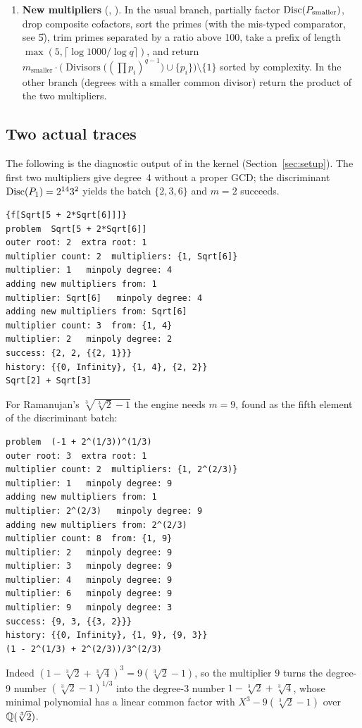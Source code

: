 \begin{enumerate}
      the new one immediately. A solution stops the search when it is the first
      finite-degree record or when the degree dropped by a factor $\ge q$;
      otherwise the search continues for ``additional denesting''. After the
      first pass, products of the promising initial multipliers are formed by
       and appended ().
\item \textbf{New multipliers} (, ). In the
      usual branch, partially factor $\operatorname{Disc}(P_{\text{smaller}})$, drop composite
      cofactors, sort the primes (with the mis-typed comparator, see \U{5}), trim
      primes separated by a ratio above 100, take a prefix of length
      $\max(5,\lceil\log1000/\log q\rceil)$, and return
      $m_{\text{smaller}}\cdot\big(\operatorname{Divisors}\big((\prod p_i)^{q-1}\big)\cup\{p_i\}\big)\setminus\{1\}$
      sorted by complexity. In the other branch (degrees with a smaller common
      divisor) return the product of the two multipliers.
\end{enumerate}

\subsection{Two actual traces}
The following is the diagnostic output of 
in the kernel (Section~\ref{sec:setup}). The first two multipliers give degree~4
without a proper GCD; the discriminant $\operatorname{Disc}(P_1)=2^{14}3^2$ yields the batch
$\{2,3,6\}$ and $m=2$ succeeds.
\begin{lstlisting}
{f[Sqrt[5 + 2*Sqrt[6]]]}
problem  Sqrt[5 + 2*Sqrt[6]]
outer root: 2  extra root: 1
multiplier count: 2  multipliers: {1, Sqrt[6]}
multiplier: 1   minpoly degree: 4
adding new multipliers from: 1
multiplier: Sqrt[6]   minpoly degree: 4
adding new multipliers from: Sqrt[6]
multiplier count: 3  from: {1, 4}
multiplier: 2   minpoly degree: 2
success: {2, 2, {{2, 1}}}
history: {{0, Infinity}, {1, 4}, {2, 2}}
Sqrt[2] + Sqrt[3]
\end{lstlisting}
For Ramanujan's $\sqrt[3]{\sqrt[3]2-1}$ the engine needs $m=9$, found as the
fifth element of the discriminant batch:
\begin{lstlisting}
problem  (-1 + 2^(1/3))^(1/3)
outer root: 3  extra root: 1
multiplier count: 2  multipliers: {1, 2^(2/3)}
multiplier: 1   minpoly degree: 9
adding new multipliers from: 1
multiplier: 2^(2/3)   minpoly degree: 9
adding new multipliers from: 2^(2/3)
multiplier count: 8  from: {1, 9}
multiplier: 2   minpoly degree: 9
multiplier: 3   minpoly degree: 9
multiplier: 4   minpoly degree: 9
multiplier: 6   minpoly degree: 9
multiplier: 9   minpoly degree: 3
success: {9, 3, {{3, 2}}}
history: {{0, Infinity}, {1, 9}, {9, 3}}
(1 - 2^(1/3) + 2^(2/3))/3^(2/3)
\end{lstlisting}
Indeed $(1-\sqrt[3]2+\sqrt[3]4)^3=9(\sqrt[3]2-1)$, so the multiplier $9$ turns
the degree-9 number $(\sqrt[3]2-1)^{1/3}$ into the degree-3 number
$1-\sqrt[3]2+\sqrt[3]4$, whose minimal polynomial has a linear common factor
with $X^3-9(\sqrt[3]2-1)$ over $\mathbb{Q}(\sqrt[3]2)$.

